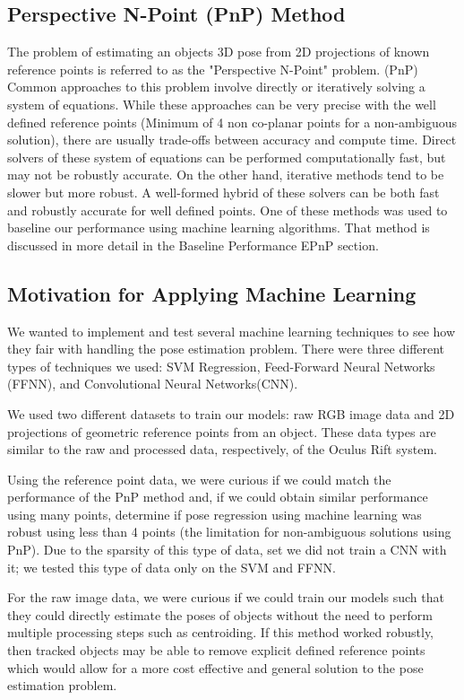 \documentclass[journal]{IEEEtran}
\begin{document}
\subsection{Perspective N-Point (PnP) Method}
The problem of estimating an objects 3D pose from 2D projections of known reference points is referred to as the "Perspective N-Point" problem. (PnP) 
Common approaches to this problem involve directly or iteratively solving a system of equations\cite{EPnP}. While these approaches can be very precise with the well defined reference points (Minimum of 4 non co-planar points for a non-ambiguous solution), there are usually trade-offs between accuracy and compute time. Direct solvers of these system of equations can be performed computationally fast, but may not be robustly accurate. On the other hand, iterative methods tend to be slower but more robust. A well-formed hybrid of these solvers can be both fast and robustly accurate for well defined points. One of these methods was used to baseline our performance using machine learning algorithms. That method is discussed in more detail in the Baseline Performance EPnP section.



\subsection{Motivation for Applying Machine Learning}
We wanted to implement and test several machine learning techniques to see how they fair with handling the pose estimation problem. There were three different types of techniques we used: SVM Regression, Feed-Forward Neural Networks (FFNN), and Convolutional Neural Networks(CNN). 

We used two different datasets to train our models: raw RGB image data and 2D projections of geometric reference points from an object.
These data types are similar to the raw and processed data, respectively, of the Oculus Rift system. 

Using the reference point data, we were curious if we could match the performance of the PnP method and, if we could obtain similar performance using many points, determine if pose regression using machine learning was robust using less than 4 points (the limitation for non-ambiguous solutions using PnP). Due to the sparsity of this type of data, set we did not train a CNN with it; we tested this type of data only on the SVM and FFNN. 

For the raw image data, we were curious if we could train our models such that they could directly estimate the poses of objects without the need to perform multiple processing steps such as centroiding. If this method worked robustly, then tracked objects may be able to remove explicit defined reference points which would allow for a more cost effective and general solution to the pose estimation problem. 
 
\end{document}
